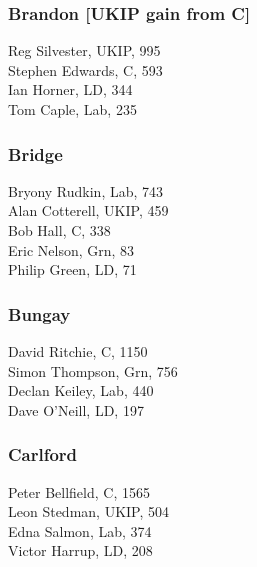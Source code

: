\documentclass[a4paper,openany,10pt]{book}
\begin{document}
\subsubsection*{Brandon \hspace*{\fill}\nolinebreak[1]%
\enspace\hspace*{\fill}
[UKIP gain from C]}



Reg Silvester, UKIP, 995\\
Stephen Edwards, C, 593\\
Ian Horner, LD, 344\\
Tom Caple, Lab, 235\\


\subsubsection*{Bridge}



Bryony Rudkin, Lab, 743\\
Alan Cotterell, UKIP, 459\\
Bob Hall, C, 338\\
Eric Nelson, Grn, 83\\
Philip Green, LD, 71\\


\subsubsection*{Bungay}



David Ritchie, C, 1150\\
Simon Thompson, Grn, 756\\
Declan Keiley, Lab, 440\\
Dave O'Neill, LD, 197\\


\subsubsection*{Carlford}



Peter Bellfield, C, 1565\\
Leon Stedman, UKIP, 504\\
Edna Salmon, Lab, 374\\
Victor Harrup, LD, 208\\
\end{document}
